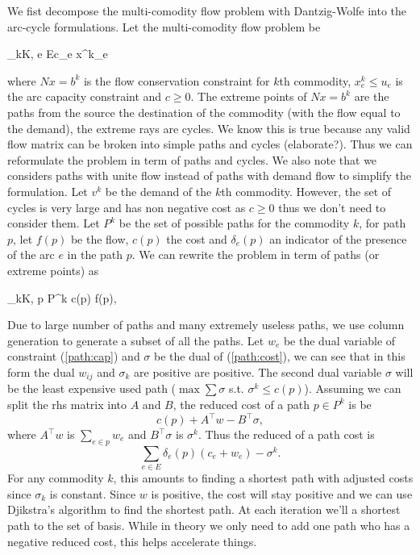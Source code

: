 \documentclass{article}
\begin{document}
 	
 	We fist decompose the multi-comodity flow problem with Dantzig-Wolfe into the arc-cycle formulations. Let the multi-comodity flow problem be 
 	\begin{mini!}{}{\sum_{k\in K, e \in E}c_e x^k_e}{}{}
 	\end{mini!}
 	where $Nx=b^k$ is the flow conservation constraint for $k$th commodity, $x^k_e \leq u_e$ is the arc capacity constraint and $c \geq 0$. The extreme points of $Nx=b^k$ are the paths from the source the destination of the commodity (with the flow equal to the demand), the extreme rays are cycles. We know this is true because any valid flow matrix can be broken into simple paths and cycles (elaborate?). Thus we can reformulate the problem in term of paths and cycles. We also note that we considers paths with unite flow instead of paths with demand flow to simplify the formulation. Let $v^k$ be the demand of the $k$th commodity. However, the set of cycles is very large and has non negative cost as $c \geq 0$ thus we don't need to consider them. Let $P^k$ be the set of possible paths for the commodity $k$, for path $p$, let $f(p)$ be the flow, $c(p)$ the cost and $\delta_e(p)$ an indicator of the presence of the arc $e$ in the path $p$. We can rewrite the problem in term of paths (or extreme points) as
 	\begin{mini!}{}{\sum_{k\in K, p \in P^k} c(p) f(p),}{}{}
 	\end{mini!}
	Due to large number of paths and many extremely useless paths, we use column generation to generate a subset of all the paths. Let $w_e$ be the dual variable of constraint (\ref{path:cap}) and $\sigma$ be the dual of (\ref{path:cost}), we can see that in this form the dual $w_{ij}$ and $\sigma_k$ are positive are positive. The second dual variable $\sigma$ will be the least expensive used path ($\max \sum\sigma$ s.t. $\sigma^k \leq c(p)$). Assuming we can split the rhs matrix into $A$ and $B$, the reduced cost of a path $p \in P^k$ is be
	\begin{equation}
		c(p) + A^\top w - B^\top \sigma,
	\end{equation} 
	where $A^\top w$ is $\sum_{e \in p} w_e$ and $B^\top\sigma$ is $\sigma^k$. Thus the reduced of a path cost is
	\begin{equation}
		\sum_{e \in E} \delta_e(p) (c_e + w_e) - \sigma^k.
	\end{equation}
	For any commodity $k$, this amounts to finding a shortest path with adjusted costs since $\sigma_k$ is constant. Since $w$ is positive, the cost will stay positive and we can use Djikstra's algorithm \parencite{dijkstraNoteTwoProblems1959} to find the shortest path. At each iteration we'll a shortest path to the set of basis. While in theory we only need to add one path who has a negative reduced cost, this helps accelerate things.
	
\end{document}
